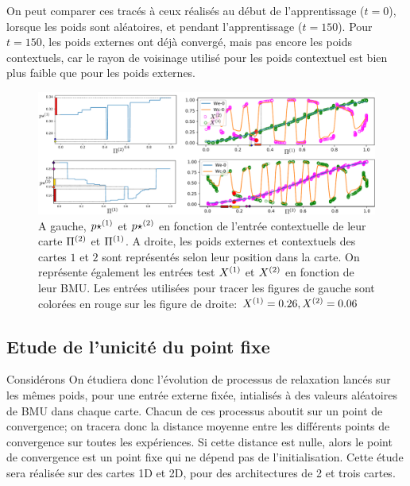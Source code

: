 On peut comparer ces tracés à ceux réalisés au début de l'apprentissage ($t=0$), lorsque les poids sont aléatoires, et pendant l'apprentissage ($t=150$). Pour $t=150$, les poids externes ont déjà convergé, mais pas encore les poids contextuels, car le rayon de voisinage utilisé pour les poids contextuel est bien plus faible que pour les poids externes.

\begin{figure}
\includegraphics[width=\textwidth]{am_w_006}
\caption{A gauche, $p\star^{({1})}$ et $p\star^{({2})}$ en fonction de l'entrée contextuelle de leur carte $\Pi^{({2})}$ et $\Pi^{({1})}$. A droite, les poids externes et contextuels des cartes $1$ et $2$ sont représentés selon leur position dans la carte. On représente également les entrées test $X^{({1})}$ et $X^{({2})}$ en fonction de leur BMU. Les entrées utilisées pour tracer les figures de gauche sont colorées en rouge sur les figure de droite: $X^{({1})}=0.26,X^{({2})}=0.06$}
\label{fig:w006}
\end{figure}


\subsection{Etude de l'unicité du point fixe}

Considérons 
On étudiera donc l'évolution de processus de relaxation lancés sur les mêmes poids, pour une entrée externe fixée, intialisés à des valeurs aléatoires de BMU dans chaque carte.
Chacun de ces processus aboutit sur un point de convergence; on tracera donc la distance moyenne entre les différents points de convergence sur toutes les expériences. Si cette distance est nulle, alors le point de convergence est un point fixe qui ne dépend pas de l'initialisation. 
Cette étude sera réalisée sur des cartes 1D et 2D, pour des architectures de 2 et trois cartes.

